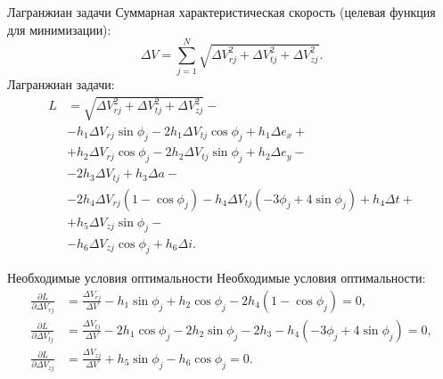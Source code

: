 \documentclass[9pt]{beamer}
\begin{document}
\begin{frame}{Лагранжиан задачи}
Суммарная характеристическая скорость (целевая функция для минимизации):
\begin{equation*}
    \Delta V = \sum_{j=1}^N \sqrt{\Delta V_{rj}^2 + \Delta V_{tj}^2 + \Delta V_{zj}^2}.
\end{equation*}
Лагранжиан задачи:
\begin{equation*}
    \begin{aligned}
        L &= \sqrt{\Delta V_{rj}^2 + \Delta V_{tj}^2 + \Delta V_{zj}^2} - \\
        &- h_1 \Delta V_{rj} \sin \phi_j - 2 h_1 \Delta V_{tj} \cos \phi_j + h_1 \Delta e_x + \\
        &+ h_2 \Delta V_{rj} \cos \phi_j - 2 h_2 \Delta V_{tj} \sin \phi_j + h_2 \Delta e_y - \\
        &- 2 h_3 \Delta V_{tj} + h_3 \Delta a - \\
        &- 2 h_4 \Delta V_{rj} (1 - \cos \phi_j) - h_4 \Delta V_{tj} (-3 \phi_j + 4 \sin \phi_j) + h_4 \Delta t + \\
        &+ h_5 \Delta V_{zj} \sin \phi_j - \\
        &- h_6 \Delta V_{zj} \cos \phi_j + h_6 \Delta i.
    \end{aligned}
\end{equation*}
\end{frame}

\begin{frame}{Необходимые условия оптимальности}
Необходимые условия оптимальности:
\begin{equation*}
    \begin{aligned}
        \frac{\partial L}{\partial \Delta V_{rj}} &= \frac{\Delta V_{rj}}{\Delta V} - h_1 \sin \phi_j + h_2 \cos \phi_j - 2 h_4 (1 - \cos \phi_j) = 0, \\
        \frac{\partial L}{\partial \Delta V_{tj}} &= \frac{\Delta V_{tj}}{\Delta V} - 2 h_1 \cos \phi_j - 2 h_2 \sin \phi_j - 2 h_3 - h_4 (-3 \phi_j + 4 \sin \phi_j) = 0, \\
        \frac{\partial L}{\partial \Delta V_{zj}} &= \frac{\Delta V_{zj}}{\Delta V} + h_5 \sin \phi_j - h_6 \cos \phi_j = 0.
    \end{aligned}
\end{equation*}
\end{frame}
\end{document}
